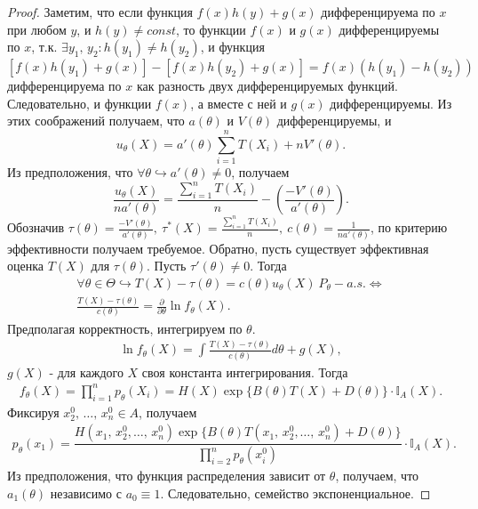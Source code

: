 \begin{proof}
Заметим, что если функция $\displaystyle f( x) h( y) +g( x)$ дифференцируема по $\displaystyle x$ при любом $\displaystyle y$, и $\displaystyle h( y) \ne const$, то функции $\displaystyle f( x)$ и $\displaystyle g( x)$ дифференцируемы по $\displaystyle x$, т.к. $\displaystyle \exists y_{1},\, y_{2} :h( y_{1}) \ne h( y_{2})$, и функция $\displaystyle [ f( x) h( y_{1}) +g( x)] -[ f( x) h( y_{2}) +g( x)] =f( x)( h( y_{1}) -h( y_{2}))$ дифференцируема по $\displaystyle x$ как разность двух дифференцируемых функций. Следовательно, и функции $\displaystyle f( x)$, а вместе с ней и $\displaystyle g( x)$ дифференцируемы.
Из этих соображений получаем, что $\displaystyle a( \theta )$ и $\displaystyle V( \theta )$ дифференцируемы, и
\begin{equation*}
u_{\theta }( X) =a'( \theta )\sum _{i=1}^{n} T( X_{i}) +nV'( \theta ) .
\end{equation*}
Из предположения, что $\displaystyle \forall \theta \hookrightarrow a'( \theta ) \neq 0$, получаем
\begin{equation*}
\frac{u_{\theta }( X)}{na'( \theta )} =\frac{\sum _{i=1}^{n} T( X_{i})}{n} -\left(\frac{-V'( \theta )}{a'( \theta )}\right) .
\end{equation*}
Обозначив $\displaystyle \tau ( \theta ) =\frac{-V'( \theta )}{a'( \theta )} ,\ \tau ^{*}( X) =\frac{\sum _{i=1}^{n} T( X_{i})}{n} ,\ c( \theta ) =\frac{1}{na'( \theta )}$, по критерию эффективности получаем требуемое.
Обратно, пусть существует эффективная оценка $\displaystyle T( X)$ для $\displaystyle \tau ( \theta )$. Пусть $\displaystyle \tau '( \theta ) \neq 0$. Тогда
\begin{gather*}
    \forall \theta \in \Theta \hookrightarrow T(X) - \tau(\theta) = c(\theta)u_\theta(X)\ P_\theta-a.s. \Leftrightarrow\\
    \frac{T(X) - \tau(\theta)}{c(\theta)} = \frac{\partial}{\partial\theta}\ln f_\theta(X).
\end{gather*}
Предполагая корректность, интегрируем по $\theta$.
\begin{gather*}
    \ln f_\theta(X) = \int\frac{T(X)-\tau(\theta)}{c(\theta)}d\theta + g(X),
\end{gather*}
$g(X)$ - для каждого $X$ своя константа интегрирования. Тогда
\begin{gather*}
    f_\theta(X) = \prod_{i=1}^n p_\theta(X_i) = H(X)\exp\{B(\theta)T(X) + D(\theta)\}\cdot\mathbb{I}_A(X).
\end{gather*}
Фиксируя $x_2^0,\, \ldots,\, x_n^0 \in A$, получаем
\begin{gather*}
    p_\theta(x_1) = \dfrac{H(x_1,\, x_2^0, \ldots,\, x_n^0)\exp\{B(\theta)T(x_1,\, x_2^0, \ldots,\, x_n^0) + D(\theta)\}}{\prod_{i=2}^n p_\theta(x_i^0)}\cdot\mathbb{I}_A(X).
\end{gather*}
Из предположения, что функция распределения зависит от $\theta$, получаем, что $a_1(\theta)$ независимо с $a_0 \equiv 1$. Следовательно, семейство экспоненциальное.
\end{proof}